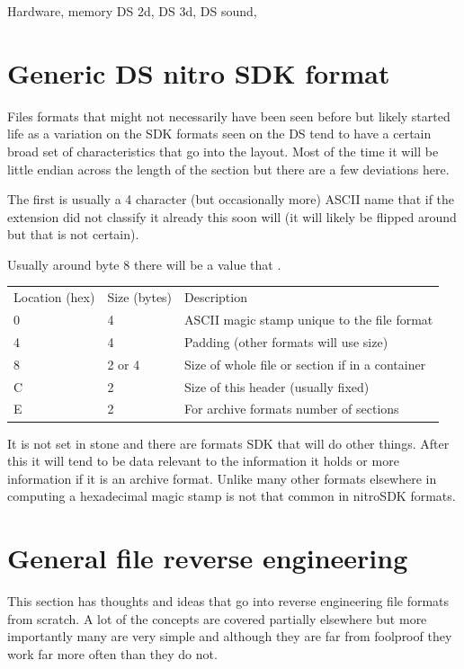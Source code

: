\documentclass[
]{book}
\begin{document}
Hardware, memory DS 2d, DS 3d, DS sound,

\hypertarget{generic-ds-nitro-sdk-format}{%
\chapter{Generic DS nitro SDK format}\label{generic-ds-nitro-sdk-format}}

Files formats that might not necessarily have been seen before but likely started life as a variation on the SDK formats seen on the DS tend to have a certain broad set of characteristics that go into the layout. Most of the time it will be little endian across the length of the section but there are a few deviations here.

The first is usually a 4 character (but occasionally more) ASCII name that if the extension did not classify it already this soon will (it will likely be flipped around but that is not certain).

Usually around byte 8 there will be a value that .

\begin{longtable}[]{@{}lll@{}}
\toprule()
\endhead
Location (hex) & Size (bytes) & Description \\
0 & 4 & ASCII magic stamp unique to the file format \\
4 & 4 & Padding (other formats will use size) \\
8 & 2 or 4 & Size of whole file or section if in a container \\
C & 2 & Size of this header (usually fixed) \\
E & 2 & For archive formats number of sections \\
\bottomrule()
\end{longtable}

It is not set in stone and there are formats SDK that will do other things. After this it will tend to be data relevant to the information it holds or more information if it is an archive format. Unlike many other formats elsewhere in computing a hexadecimal magic stamp is not that common in nitroSDK formats.

\hypertarget{general-file-reverse-engineering}{%
\chapter{General file reverse engineering}\label{general-file-reverse-engineering}}

This section has thoughts and ideas that go into reverse engineering file formats from scratch. A lot of the concepts are covered partially elsewhere but more importantly many are very simple and although they are far from foolproof they work far more often than they do not.
\end{document}
